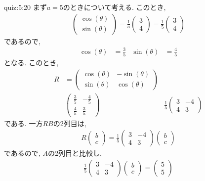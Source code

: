 \begin{answerof}{quiz:5:20}
 まず$a=5$のときについて考える.
 このとき,
 \begin{align*}
    \begin{pmatrix}\cos(\theta)\\\sin(\theta)\end{pmatrix}
    =\frac{1}{a}\begin{pmatrix}3\\4\end{pmatrix}    
    =\frac{1}{5}\begin{pmatrix}3\\4\end{pmatrix}    
  \end{align*}
 であるので,
 \begin{align*}
   \cos(\theta)&=\frac{3}{5}&
   \sin(\theta)&=\frac{4}{5}
 \end{align*}
 となる.
 このとき, 
 \begin{align*}
   R&=\begin{pmatrix}\cos(\theta)&-\sin(\theta)\\\sin(\theta)&\cos(\theta)\end{pmatrix}\\
   &\begin{pmatrix}\frac{3}{5}&-\frac{4}{5}\\\frac{4}{5}&\frac{3}{5}\end{pmatrix}
   &\frac{1}{5}\begin{pmatrix}3&-4\\4&3\end{pmatrix}
 \end{align*}
 である.
 一方$RB$の2列目は,
 \begin{align*}
   R\begin{pmatrix}b\\c\end{pmatrix}
   =\frac{1}{5}\begin{pmatrix}3&-4\\4&3\end{pmatrix}\begin{pmatrix}b\\c\end{pmatrix}
\end{align*}
 であるので, $A$の2列目と比較し,
 \begin{align*}
\frac{1}{5}\begin{pmatrix}3&-4\\4&3\end{pmatrix}\begin{pmatrix}b\\c\end{pmatrix}=\begin{pmatrix}5\\5\end{pmatrix}

\end{align*}
\end{answerof}
